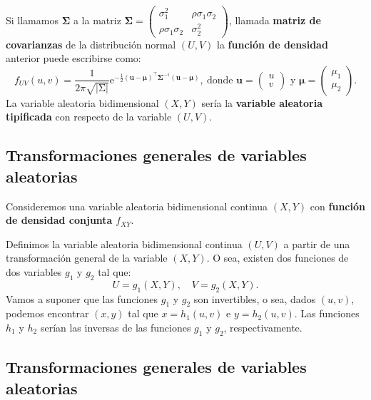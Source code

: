 \documentclass[]{book}
\begin{document}
Si llamamos \(\mathbf{\Sigma}\) a la matriz \(\mathbf{\Sigma}=\begin{pmatrix}\sigma_1^2 & \rho\sigma_1\sigma_2\\ \rho\sigma_1\sigma_2 & \sigma_2^2\end{pmatrix}\), llamada \textbf{matriz de covarianzas} de la distribución normal \((U,V)\) la \textbf{función de densidad} anterior puede escribirse como:
\[
f_{UV}(u,v)=\frac{1}{2\pi \sqrt{\left|\mathrm{\Sigma}\right|}}\mathrm{e}^{-\frac{1}{2}(\mathbf{u}-\mathbf{\mu})^\top \mathbf{\Sigma}^{-1}(\mathbf{u}-\mathbf{\mu})},\ \mbox{donde $\mathbf{u}=\begin{pmatrix}u \\ v\end{pmatrix}$ y $\mathbf{\mu}=\begin{pmatrix}\mu_1\\\mu_2\end{pmatrix}$.}
\]
La variable aleatoria bidimensional \((X,Y)\) sería la \textbf{variable aleatoria tipificada} con respecto de la variable \((U,V)\).

\hypertarget{transformaciones-generales-de-variables-aleatorias}{%
\subsection{Transformaciones generales de variables aleatorias}\label{transformaciones-generales-de-variables-aleatorias}}

Consideremos una variable aleatoria bidimensional continua \((X,Y)\) con \textbf{función de densidad conjunta} \(f_{XY}\).

Definimos la variable aleatoria bidimensional continua \((U,V)\) a partir de una transformación general de la variable \((X,Y)\). O sea, existen dos funciones de dos variables \(g_1\) y \(g_2\) tal que:
\[
U  = g_1 (X,Y),\quad 
V  = g_2 (X,Y).
\]
Vamos a suponer que las funciones \(g_1\) y \(g_2\) son invertibles, o sea, dados \((u,v)\), podemos encontrar \((x,y)\) tal que \(x=h_1(u,v)\) e \(y=h_2(u,v)\). Las funciones \(h_1\) y \(h_2\) serían las inversas de las funciones \(g_1\) y \(g_2\), respectivamente.

\hypertarget{transformaciones-generales-de-variables-aleatorias-1}{%
\subsection{Transformaciones generales de variables aleatorias}\label{transformaciones-generales-de-variables-aleatorias-1}}
\end{document}
